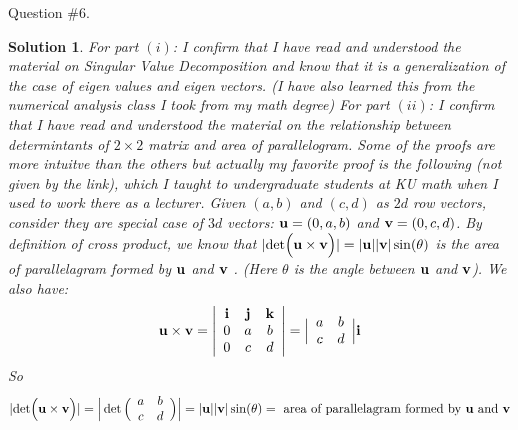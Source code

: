 \documentclass[11pt]{article}
\newtheorem{sol}{Solution}
\begin{document}
Question $\#6$.
\begin{sol}
	For part $(i)$:\vskip 2mm
	I confirm that I have read and understood the material on Singular Value Decomposition and know that it is a generalization of the case of eigen values and eigen vectors. (I have also learned this from the numerical analysis class I took from my math degree)\vskip 2mm
	For part $(ii)$:\vskip 2mm
	I confirm that I have read and understood the material on the relationship between determintants of $2 \times 2$ matrix and area of parallelogram. \vskip 2mm
	Some of the proofs are more intuitve than the others but actually my favorite proof is the following (not given by the link), which I taught to undergraduate students at KU math when I used to work there as a lecturer.\vskip 2mm
	Given $(a, b)$ and $(c, d)$ as $2d$ row vectors, consider they are special case of $3d$ vectors: ${\bf u} = (0, a, b)$ and ${\bf v} = (0, c, d)$. By definition of cross product, we know that $|\text{det}\Big({\bf u} \times {\bf v}\Big)| = |{\bf u}||{\bf v}|\sin(\theta)$ is the area of parallelagram formed by ${\bf u}$ and ${\bf v}$ . (Here $\theta$ is the angle between ${\bf u}$ and ${\bf v}$). We also have:
	\begin{align*}
		{\bf u}\times {\bf v} = \left|\begin{array}{ccc} {\bf i}&{\bf j}&{\bf k}\\0 &a&b \\0 &c&d\end{array}\right| = \Big|\begin{array}{cc}a& b\\ c& d\end{array}\Big|{\bf i}
	\end{align*}
	So 
	\begin{align*}
		|\text{det}\Big({\bf u}\times {\bf v} \Big) |=\Big|\det\Big(\begin{array}{cc}a& b\\ c& d\end{array}\Big)\Big| =  |{\bf u}||{\bf v}|\sin(\theta) = \text{ area of parallelagram formed by }{\bf u} \text{ and } {\bf v}
	\end{align*}
\end{sol}
\end{document}
